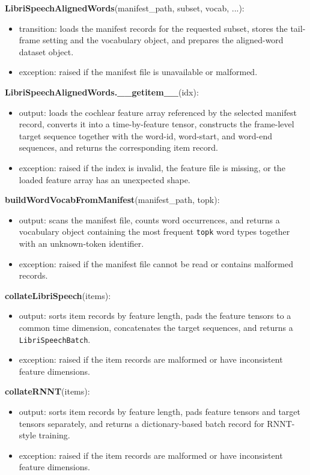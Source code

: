 \documentclass[12pt, titlepage]{article}
\begin{document}
\noindent \textbf{LibriSpeechAlignedWords}(manifest\_path, subset, vocab, ...):
\begin{itemize}
    \item transition: loads the manifest records for the requested subset,
    stores the tail-frame setting and the vocabulary object, and prepares the aligned-word dataset object.
    \item exception: raised if the manifest file is unavailable or malformed.
\end{itemize}

\noindent \textbf{LibriSpeechAlignedWords.\_\_getitem\_\_}(idx):
\begin{itemize}
    \item output: loads the cochlear feature array referenced by the selected manifest record, converts it into a time-by-feature tensor, constructs the frame-level target sequence together with the word-id, word-start, and word-end sequences, and returns the corresponding item record.
    \item exception: raised if the index is invalid, the feature file is missing,
    or the loaded feature array has an unexpected shape.
\end{itemize}

\noindent \textbf{buildWordVocabFromManifest}(manifest\_path, topk):
\begin{itemize}
    \item output: scans the manifest file, counts word occurrences, and returns a vocabulary object containing the most frequent \texttt{topk} word types together with an unknown-token identifier.
    \item exception: raised if the manifest file cannot be read or contains malformed records.
\end{itemize}

\noindent \textbf{collateLibriSpeech}(items):
\begin{itemize}
    \item output: sorts item records by feature length, pads the feature tensors to a common time dimension, concatenates the target sequences, and returns a \texttt{LibriSpeechBatch}.
    \item exception: raised if the item records are malformed or have inconsistent feature dimensions.
\end{itemize}

\noindent \textbf{collateRNNT}(items):
\begin{itemize}
    \item output: sorts item records by feature length, pads feature tensors and target tensors separately, and returns a dictionary-based batch record for RNNT-style training.
    \item exception: raised if the item records are malformed or have inconsistent feature dimensions.
\end{itemize}
\end{document}
